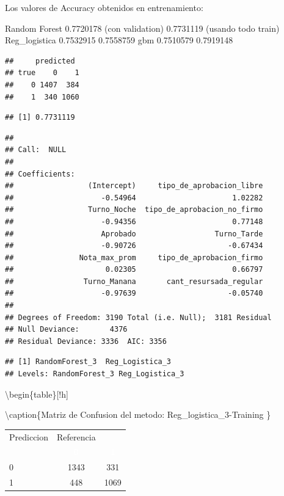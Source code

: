 \documentclass[]{article}
\begin{document}
Los valores de Accuracy obtenidos en entrenamiento:

Random Forest 0.7720178 (con validation) 0.7731119 (usando todo train)
Reg\_logistica 0.7532915 0.7558759 gbm 0.7510579 0.7919148

\begin{lstlisting}
##     predicted
## true    0    1
##    0 1407  384
##    1  340 1060
\end{lstlisting}

\begin{lstlisting}
## [1] 0.7731119
\end{lstlisting}

\begin{lstlisting}
## 
## Call:  NULL
## 
## Coefficients:
##                 (Intercept)     tipo_de_aprobacion_libre  
##                    -0.54964                      1.02282  
##                 Turno_Noche  tipo_de_aprobacion_no_firmo  
##                    -0.94356                      0.77148  
##                    Aprobado                  Turno_Tarde  
##                    -0.90726                     -0.67434  
##               Nota_max_prom     tipo_de_aprobacion_firmo  
##                     0.02305                      0.66797  
##                Turno_Manana       cant_resursada_regular  
##                    -0.97639                     -0.05740  
## 
## Degrees of Freedom: 3190 Total (i.e. Null);  3181 Residual
## Null Deviance:       4376 
## Residual Deviance: 3336  AIC: 3356
\end{lstlisting}

\begin{lstlisting}
## [1] RandomForest_3  Reg_Logistica_3
## Levels: RandomForest_3 Reg_Logistica_3
\end{lstlisting}

\textbackslash{}begin\{table\}{[}!h{]}

\textbackslash{}caption\{\label{tab:MatrizConf_Reg_logistica_3-Training}Matriz
de Confusion del metodo: Reg\_logistica\_3-Training \} \centering

\begin{tabular}[t]{lcc}
\toprule
\multicolumn{1}{c}{Prediccion} & \multicolumn{1}{c}{Referencia} & \multicolumn{1}{c}{ } \\
\cmidrule(l{3pt}r{3pt}){1-1} \cmidrule(l{3pt}r{3pt}){2-2}
\rowcolor{black}  \multicolumn{1}{c}{\textcolor{white}{\textbf{ }}} & \multicolumn{1}{c}{\textcolor{white}{\textbf{0}}} & \multicolumn{1}{c}{\textcolor{white}{\textbf{1}}}\\
\midrule
\rowcolor{gray!6}  0 & 1343 & 331\\
1 & 448 & 1069\\
\bottomrule
\end{tabular}
\end{document}
